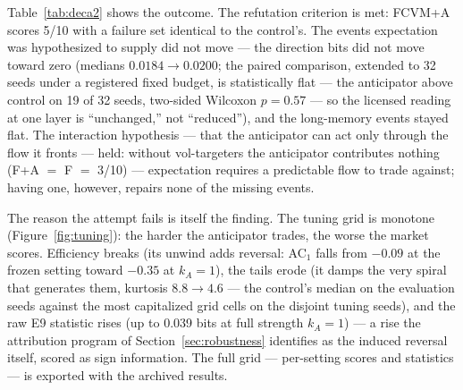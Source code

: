 \documentclass[11pt]{article}
\newcommand{\cfg}[1]{\mbox{#1}}
\begin{document}
Table~\ref{tab:deca2} shows the outcome. The refutation criterion is met:
\cfg{FCVM+A} scores 5/10 with a failure set identical to the control's. The
events expectation was hypothesized to supply did not move --- the direction bits
did not move toward zero (medians $0.0184 \to 0.0200$; the paired comparison,
extended to 32 seeds under a registered fixed budget, is statistically flat
--- the anticipator above control on 19 of 32 seeds, two-sided Wilcoxon
$p = 0.57$ --- so the licensed reading at one layer is
``unchanged,'' not ``reduced''), and the long-memory events stayed flat.
The interaction hypothesis --- that the anticipator can act only through the
flow it fronts --- held: without vol-targeters the anticipator
contributes nothing (\cfg{F+A} $=$ \cfg{F} $=$ 3/10) --- expectation requires
a predictable flow to trade against; having one, however, repairs none of the
missing events.

The reason the attempt fails is itself the finding. The tuning grid is
monotone (Figure~\ref{fig:tuning}): the harder the
anticipator trades, the worse the market scores. Efficiency breaks (its unwind
adds reversal: AC$_1$ falls from $-0.09$ at the frozen setting toward $-0.35$
at $k_A = 1$), the
tails erode (it damps the very spiral that generates them, kurtosis
$8.8 \to 4.6$ --- the control's median on the evaluation seeds against
the most capitalized grid cells on the disjoint tuning seeds), and
the raw E9 statistic rises (up to 0.039 bits at full
strength $k_A = 1$) --- a rise the attribution program of
Section~\ref{sec:robustness} identifies as the induced reversal itself,
scored as sign information. The full grid --- per-setting scores and
statistics --- is exported with the archived results.
\end{document}

